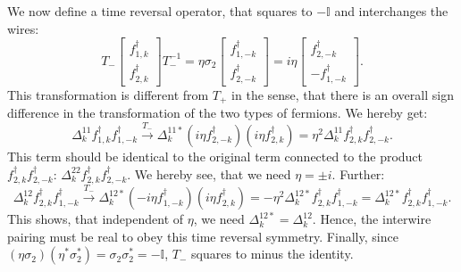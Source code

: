 We now define a time reversal operator, that squares to $-\mathbb{I}$ and interchanges the wires:
\begin{equation}
T_-\begin{bmatrix} f^\dagger_{1,k} \\ f^\dagger_{2,k} \end{bmatrix} T_-^{-1} = \eta\sigma_2 \begin{bmatrix} f^\dagger_{1,-k} \\ f^\dagger_{2,-k} \end{bmatrix} = i\eta\begin{bmatrix} f^\dagger_{2,-k} \\ - f^\dagger_{1,-k} \end{bmatrix}.\nonumber
\end{equation} 
This transformation is different from $T_+$ in the sense, that there is an overall sign difference in the transformation of the two types of fermions.  
We hereby get:
\begin{equation}
\Delta^{11}_k f^\dagger_{1,k}f^\dagger_{1,-k} \overset{T_-}{\to} \Delta^{11*}_k \left(i\eta f^\dagger_{2,-k}\right)\left(i\eta f^\dagger_{2,k}\right) = \eta^2\Delta^{11}_k f^\dagger_{2,k}f^\dagger_{2,-k}. \nonumber
\end{equation}
This term should be identical to the original term connected to the product $f^\dagger_{2,k}f^\dagger_{2,-k}$: $\Delta^{22}_k f^\dagger_{2,k}f^\dagger_{2,-k}$. We hereby see, that we need $\eta = \pm i$. Further:
\begin{equation}
\Delta^{12}_k f^\dagger_{2,k}f^\dagger_{1,-k} \overset{T_-}{\to} \Delta^{12*}_k \left(-i\eta f^\dagger_{1,-k}\right)\left( i\eta f^\dagger_{2,k}\right) = -\eta^2 \Delta^{12*}_k f^\dagger_{2,k}f^\dagger_{1,-k} = \Delta^{12*}_k f^\dagger_{2,k}f^\dagger_{1,-k}. \nonumber
\end{equation}
This shows, that independent of $\eta$, we need $\Delta^{12*}_k = \Delta^{12}_k$. Hence, the interwire pairing must be real to obey this time reversal symmetry. Finally, since $(\eta \sigma_2)(\eta^* \sigma_2^*) = \sigma_2\sigma_2^* = -\mathbb{I}$, $T_-$ squares to minus the identity. 

